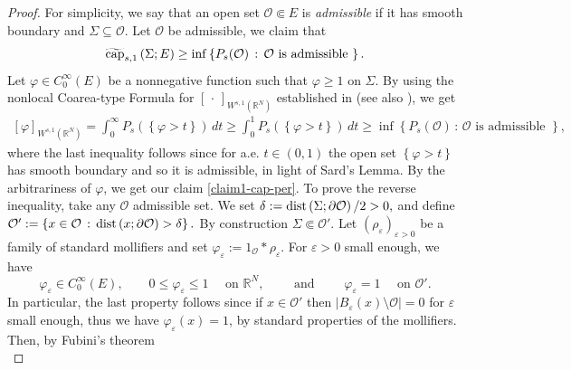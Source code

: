 \documentclass{amsart}
\theoremstyle{definition}
\numberwithin{equation}{section}
\begin{document}
\begin{proof}
	For simplicity, we say that an open set $\mathcal{O} \Subset E$ is {\it admissible} if it has smooth boundary and $\Sigma \subseteq \mathcal{O}.$ Let $\mathcal{O}$ be admissible, we claim that 
	\begin{equation} \label{claim1-cap-per}
		\widetilde{{\rm cap}}_{s,1}\left(\Sigma; E\right)  \ge \inf\left\{P_s(\mathcal{O})\,:\, \mathcal{O} \mbox{ is admissible } \right\}.
	\end{equation}
	Let $\varphi \in C^\infty_0(E)$ be a nonnegative function such that $\varphi \ge 1$ on $\Sigma$. By using the nonlocal Coarea-type Formula for $[\,\cdot\,]_{W^{s,1}(\mathbb{R}^N)}$ established in \cite{Visintin} (see also \cite[Lemma 10]{AmbDePMar}), we get  
	\[
	\begin{split}
		[\varphi]_{W^{s,1}(\mathbb{R}^N)} = \int_{0}^{\infty} P_s \left(\left\{\varphi > t\right\}\right)\,dt \ge \int_0^1 P_s\left(\left\{\varphi > t\right\}\right)\,dt \ge  \inf\left\{P_s(\mathcal{O})\,:\, \mathcal{O} \mbox{ is admissible } \right\},
	\end{split}
	\]
	where the last inequality follows since for a.e. $t \in (0,1)$ the open set $\left\{\varphi > t\right\}$ has smooth boundary and so it is admissible, in light of Sard's Lemma. By the arbitrariness of $\varphi$, we get our claim \eqref{claim1-cap-per}.  To prove the reverse inequality, take any $\mathcal{O}$ admissible set. We set 
	$
	\delta:= {\rm dist}\left(\Sigma; \partial\mathcal{O}\right)/2 > 0, 
	$ 
	and define $\mathcal{O}' := \left\{x \in \mathcal{O}\,:\, {\rm dist}\left(x; \partial\mathcal{O}\right) > \delta\right\}.$
	By construction $\Sigma \Subset \mathcal{O}'$. Let $(\rho_{\varepsilon})_{\varepsilon > 0}$ be a family of standard mollifiers and set $\varphi_{\varepsilon} := {1}_{\mathcal{O}} \ast \rho_{\varepsilon}$.
	For $\varepsilon > 0$ small enough, we have 
	\begin{equation} \label{prop:ammissibile-generale}
		\varphi_{\varepsilon} \in C^\infty_0(E), \qquad 0 \le \varphi_{\varepsilon} \le 1 \quad \mbox{ on } \mathbb{R}^N, \qquad \mbox{ and } \qquad \varphi_{\varepsilon} =1 \quad \mbox{ on } \mathcal{O}'.
	\end{equation}
	In particular, the last property follows since if $x \in \mathcal{O}'$ then $|B_\varepsilon(x) \setminus \mathcal{O}| = 0$ for $\varepsilon$ small enough, thus we have $\varphi_\varepsilon(x) = 1$, by standard properties of the mollifiers. Then, by Fubini's theorem
	\begin{equation*}\label{ok1}

\end{equation*}
\end{proof}
\end{document}
